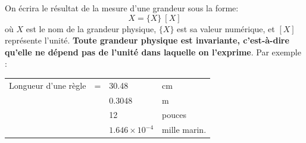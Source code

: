 On écrira le résultat de la mesure d'une grandeur sous la forme:
$$
    X = \{X\}\ [X]
$$
où $X$ est le nom de la grandeur physique, $\{X\}$ est sa valeur numérique, et $[X]$ représente l'unité. \textbf{Toute grandeur physique est invariante, c'est-à-dire qu'elle ne dépend pas de l'unité dans laquelle on l'exprime}. Par exemple :
\begin{table}[htbp]
    \begin{flushleft}
        \begin{tabular}{lcll}
            Longueur d'une règle & = & 30.48                & cm           \\
                                 &   & 0.3048               & m            \\
                                 &   & 12                   & pouces       \\
                                 &   & $1.646\times10^{-4}$ & mille marin.
        \end{tabular}
    \end{flushleft}
\end{table}

\begin{center}
\end{center}
